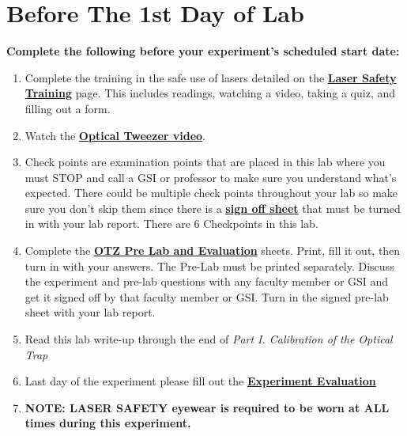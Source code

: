\documentclass{../lab}
\begin{document}
\newpage

\section{Before The 1st Day of Lab}

\textbf{Complete the following before your experiment's scheduled start date:}

\begin{enumerate}
    \item Complete the training in the safe use of lasers detailed on the \href{http://experimentationlab.berkeley.edu/LaserSafety}{\textbf{Laser Safety Training}} page. This includes readings, watching a video, taking a quiz, and filling out a form.

    \item Watch the \href{http://youtu.be/bqIBcjcAhso}{\textbf{Optical Tweezer video}}.

    \item Check points are examination points that are placed in this lab where you must STOP and call a GSI or professor to make sure you understand what's expected. There could  be multiple check points throughout your lab so make sure you don't skip them since there is a \href{http://experimentationlab.berkeley.edu/otzcheckpoints}{\textbf{sign off sheet}} that must be turned in with your lab report. There are 6 Checkpoints in this lab.

    \item Complete the \href{http://experimentationlab.berkeley.edu/OTZprelab}{\textbf{OTZ Pre Lab and Evaluation}} sheets. Print, fill it out, then turn in with your answers. The Pre-Lab must be printed separately. Discuss the experiment and pre-lab questions with any faculty member or GSI and get it signed off by that faculty member or GSI. Turn in the signed pre-lab sheet with your lab report.

    \item Read this lab write-up through the end of \emph{Part I. Calibration of the Optical Trap}

    \item Last day of the experiment please fill out the \href{\ExperimentEvaluation}{\textbf{Experiment Evaluation}}

    \item \textbf{NOTE: LASER  SAFETY eyewear is required to be worn at ALL times during this experiment.}

\end{enumerate}
\end{document}
